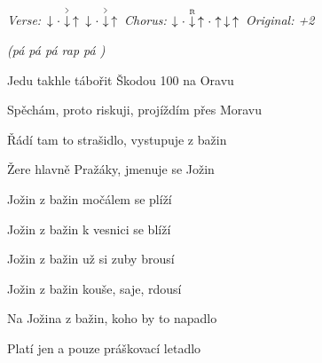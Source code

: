 \begin{song}


 \quad
\textit{Verse:} $\Down\Miss\AccentDown\Up\ \Down\Miss\AccentDown\Up$ \quad
\textit{Chorus:} $\Down\Miss\PluckDown{R}\Up\Miss\Up\Down\Up$ \quad
\textit{Original: +2}

\large

\begin{chordbox}
\par
{}\par
{}\par
{}\par
{}\par
{}\par
{}\par
{}\par
\end{chordbox}

\Large

\bigskip

 \textit{(pá pá pá rap pá )} \par
{}Jedu takhle tábořit Škodou 100 na Oravu \par
{}Spěchám, proto riskuji, projíždím přes Moravu \par
{}Řádí tam to strašidlo, vystupuje z bažin \par
{}Žere hlavně Pražáky, jmenuje se Jožin \par

\bigskip

\begin{chorusbox}{\Refren}
Jožin z bažin močálem se plíží \par
{}Jožin z bažin k vesnici se blíží \par
{}Jožin z bažin už si zuby brousí \par
{}Jožin z bažin kouše, saje, rdousí \par
{}Na Jožina z bažin, koho by to napadlo  \par
{}Platí jen a pouze práškovací letadlo  \par
\end{chorusbox}


\end{song}
